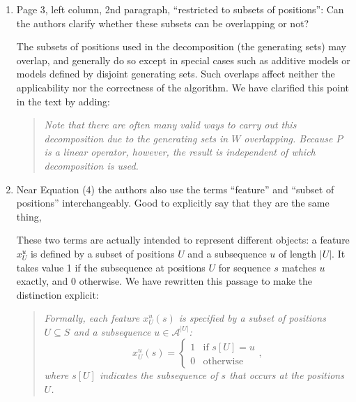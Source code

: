 \documentclass[11pt]{article}
\newenvironment{response}{\par\color{responseblue}}{\par}
\newenvironment{msquote}
  {\begin{quote}\color{responseblue}\itshape\noindent\ignorespaces}
  {\end{quote}}
\begin{document}
\begin{enumerate}
\begin{response}
We have reworked Figure 1 to more
clearly show the positions of the parameter choices, the zero-sum gauge plane, and
the line of equivalent parameters in 3D space.
\end{response}

\item Page 3, left column, 2nd paragraph, ``restricted to subsets of positions'':
Can the authors clarify whether these subsets can be overlapping or not?

\begin{response}
The subsets of positions used in the decomposition (the generating sets) may
overlap, and generally do so except in special cases such as additive models or
models defined by disjoint generating sets. Such overlaps affect neither the
applicability nor the correctness of the algorithm. We have clarified this point
in the text by adding:
\end{response}

\begin{msquote}
Note that there are often many valid ways to carry out this decomposition due to the generating sets in $W$ overlapping. Because $P$ is a linear operator, however, the result is independent of which decomposition is used.
\end{msquote}

\item Near Equation (4) the authors also use the terms ``feature'' and ``subset of
positions'' interchangeably. Good to explicitly say that they are the same thing,

\begin{response}
These two terms are actually intended to represent different objects: a feature $x^u_U$ is defined by a subset of positions
$U$ and a subsequence $u$ of length $|U|$. It takes value 1 if the subsequence at
positions $U$ for sequence $s$ matches $u$ exactly, and 0 otherwise. We have
rewritten this passage to make the distinction explicit:
\end{response}

\begin{msquote}
Formally, each feature $x^u_U(s)$ is specified by a subset of positions
$U \subseteq S$ and a subsequence $u \in \mathcal{A}^{|U|}$:
\begin{equation*}
x^u_U(s) = \left\{
  \begin{array}{cl}
    1 & \textrm{if~} s[U] = u \\
    0 & \textrm{otherwise}
  \end{array} \right.,
\end{equation*}
where $s[U]$ indicates the subsequence of $s$ that occurs at the positions $U$.
\end{msquote}


\end{enumerate}
\end{document}
